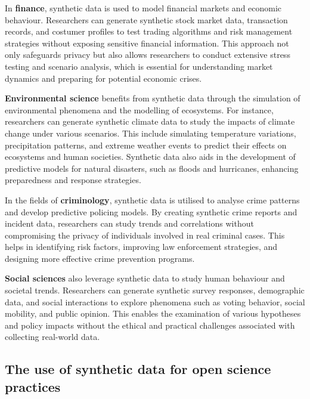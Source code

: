 In \textbf{finance}, synthetic data is used to model financial markets and economic behaviour. Researchers can generate synthetic stock market data, transaction records, and costumer profiles to test trading algorithms and risk management strategies without exposing sensitive financial information. This approach not only safeguards privacy but also allows researchers to conduct extensive stress testing and scenario analysis, which is essential for understanding market dynamics and preparing for potential economic crises. \cite{assefa2020generating,eckerli2021generative}

\textbf{Environmental science} benefits from synthetic data through the simulation of environmental phenomena and the modelling of ecosystems. For instance, researchers can generate synthetic climate data to study the impacts of climate change under various scenarios. This include simulating temperature variations, precipitation patterns, and extreme weather events to predict their effects on ecosystems and human societies. Synthetic data also aids in the development of predictive models for natural disasters, such as floods and hurricanes, enhancing preparedness and response strategies. \cite{kravitz2021potential,perez2021machine}

In the fields of \textbf{criminology}, synthetic data is utilised to analyse crime patterns and develop predictive policing models. By creating synthetic crime reports and incident data, researchers can study trends and correlations without compromising the privacy of individuals involved in real criminal cases. This helps in identifying risk factors, improving law enforcement strategies, and designing more effective crime prevention programs. \cite{brunton2024using}

\textbf{Social sciences} also leverage synthetic data to study human behaviour and societal trends. Researchers can generate synthetic survey responses, demographic data, and social interactions to explore phenomena such as voting behavior, social mobility, and public opinion. This enables the examination of various hypotheses and policy impacts without the ethical and practical challenges associated with collecting real-world data. \cite{hradec2022multipurpose,kokosi2022overview}


\subsection{The use of synthetic data for open science practices}

